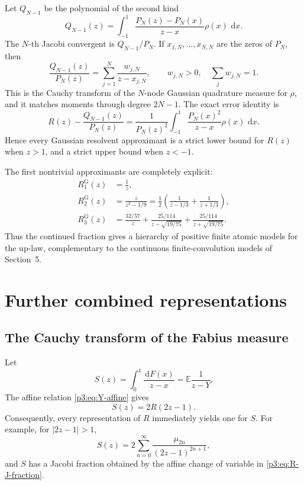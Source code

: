 \documentclass[11pt]{article}
\theoremstyle{definition}
\theoremstyle{remark}
\newcommand{\E}{\mathbb E}
\newcommand{\dd}{\,\mathrm d}
\begin{document}
Let \(Q_{N-1}\) be the polynomial of the second kind
\begin{equation}
 Q_{N-1}(z)=\int_{-1}^{1}
 \frac{P_N(z)-P_N(x)}{z-x}\rho(x)\,\dd x.                    \label{p3:eq:second-kind}
\end{equation}
The \(N\)-th Jacobi convergent is \(Q_{N-1}/P_N\).  If
\(x_{1,N},\dots,x_{N,N}\) are the zeros of \(P_N\), then
\begin{equation}
 \boxed{
 \frac{Q_{N-1}(z)}{P_N(z)}
 =\sum_{j=1}^{N}\frac{w_{j,N}}{z-x_{j,N}},
 \qquad w_{j,N}>0,\quad \sum_jw_{j,N}=1.
 }                                                           \label{p3:eq:gauss-partial}
\end{equation}
This is the Cauchy transform of the \(N\)-node Gaussian quadrature measure for \(\rho\),
and it matches moments through degree \(2N-1\).  The exact error identity is
\begin{equation}
 R(z)-\frac{Q_{N-1}(z)}{P_N(z)}
 =\frac1{P_N(z)^2}\int_{-1}^{1}
 \frac{P_N(x)^2}{z-x}\rho(x)\,\dd x.                        \label{p3:eq:Markov-error}
\end{equation}
Hence every Gaussian resolvent approximant is a strict lower bound for \(R(z)\) when
\(z>1\), and a strict upper bound when \(z<-1\).

The first nontrivial approximants are completely explicit:
\begin{align}
 R_1^{\mathrm G}(z)&=\frac1z,\\
 R_2^{\mathrm G}(z)&=\frac{z}{z^2-1/9}
 =\frac12\left(\frac1{z-1/3}+\frac1{z+1/3}\right),\\
 R_3^{\mathrm G}(z)&=
 \frac{32/57}{z}
 +\frac{25/114}{z-\sqrt{19/75}}
 +\frac{25/114}{z+\sqrt{19/75}}.
\end{align}
Thus the continued fraction gives a hierarchy of positive finite atomic models for the
up-law, complementary to the continuous finite-convolution models of Section~5.

\section{Further combined representations}

\subsection{The Cauchy transform of the Fabius measure}

Let
\begin{equation}
 S(z)=\int_0^1\frac{\dd F(x)}{z-x}=\E\frac1{z-Y}.            \label{p3:eq:S-def}
\end{equation}
The affine relation \eqref{p3:eq:Y-affine} gives
\begin{equation}
 \boxed{S(z)=2R(2z-1).}                                     \label{p3:eq:S-R}
\end{equation}
Consequently, every representation of \(R\) immediately yields one for \(S\).  For example,
for \(|2z-1|>1\),
\begin{equation}
 S(z)=2\sum_{n=0}^{\infty}\frac{\mu_{2n}}{(2z-1)^{2n+1}},   \label{p3:eq:S-moment}
\end{equation}
and \(S\) has a Jacobi fraction obtained by the affine change of variable in
\eqref{p3:eq:R-J-fraction}.
\end{document}
